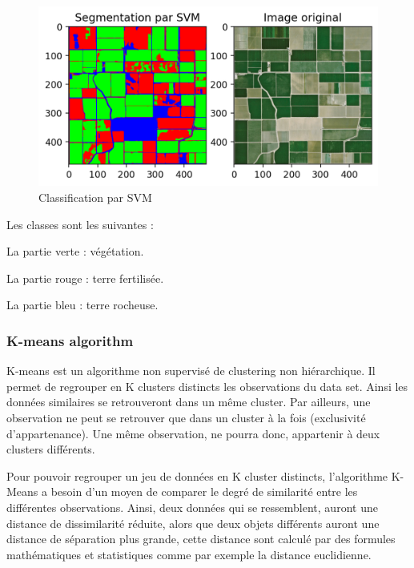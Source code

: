 \documentclass[12pt, openany]{report}
\begin{document}
\begin{figure}[H]
\centering
\hspace*{-0.5in}
\includegraphics[scale=1.2]{classification.png}
\caption{Classification par SVM}
\end{figure}

\noindent Les classes sont les suivantes : 

\begin{mylist}
\item La partie verte : végétation.
\item La partie rouge : terre fertilisée.
\item La partie bleu : terre rocheuse.
\end{mylist}

\subsubsection{K-means algorithm}


\cite{k-means definition}K-means est un algorithme non supervisé de clustering non hiérarchique. Il permet de regrouper en K clusters distincts les observations du data set. Ainsi les données similaires se retrouveront  dans un même cluster. Par ailleurs, une observation ne peut se retrouver que dans un cluster à la fois (exclusivité d’appartenance). Une même observation, ne pourra donc, appartenir à deux clusters différents.



Pour pouvoir regrouper un jeu de données en K cluster distincts, l’algorithme K-Means a besoin d’un moyen de comparer le degré de similarité entre les différentes observations. Ainsi, deux données qui se ressemblent, auront une distance de dissimilarité  réduite, alors que deux objets différents auront une distance de séparation plus grande, cette distance sont calculé par des formules mathématiques et statistiques comme par exemple la distance euclidienne.
\end{document}
